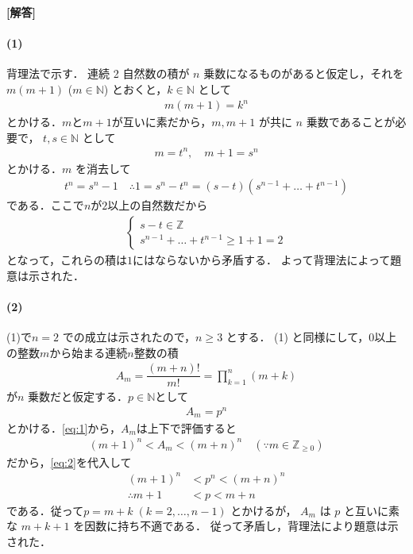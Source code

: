 \documentclass[../../main.tex]{subfiles}
\begin{document}
\begin{oframed}
  
\end{oframed}

{\bf [解答]}

\paragraph{(1)}

背理法で示す．
連続 2 自然数の積が $n$ 乗数になるものがあると仮定し，それを $m(m+1)$ ($m \in \mathbb{N}$) とおくと，$k \in \mathbb{N}$ として
\begin{align}
  m(m+1) = k^n
\end{align}
とかける．$m$と$m+1$が互いに素だから，$m, m+1$ が共に $n$ 乗数であることが必要で，
$t, s \in \mathbb{N}$ として
\begin{align}
  m = t^n, \quad m+1 = s^n
\end{align}
とかける．$m$ を消去して
\begin{align}
  t^n = s^n - 1 \quad \therefore 1 = s^n - t^n = (s-t)(s^{n-1} + \dots + t^{n-1})
\end{align}
である．ここで$n$が$2$以上の自然数だから
\begin{align}
  \begin{cases}
    s-t \in \mathbb{Z} \\
    s^{n-1} + \dots + t^{n-1} \ge 1+1 = 2
  \end{cases}
\end{align}
となって，これらの積は$1$にはならないから矛盾する．
よって背理法によって題意は示された．

\paragraph{(2)}

(1)で$n=2$ での成立は示されたので，$n \ge 3$ とする．
(1) と同様にして，$0$以上の整数$m$から始まる連続$n$整数の積
\begin{align}
  A_m = \dfrac{(m+n)!}{m!} = \prod_{k=1}^n (m+k) \label{eq:1}
\end{align}
が$n$ 乗数だと仮定する．$p\in\mathbb{N}$として
\begin{align}
  A_m = p^n \label{eq:2}
\end{align}
とかける．\cref{eq:1}から，$A_m$は上下で評価すると
\begin{align}
  (m+1)^n < A_m < (m+n)^n \quad  (\because m \in \mathbb{Z}_{\ge 0})
\end{align}
だから，\cref{eq:2}を代入して
\begin{align}
  (m+1)^n &< p^n < (m+n)^n \\
  \therefore
  m+1 &< p < m+n
\end{align}
である．従って$p = m+k \; (k=2, \dots, n-1)$ とかけるが，
$A_m$ は $p$ と互いに素な $m+k+1$ を因数に持ち不適である．
従って矛盾し，背理法により題意は示された．
\end{document}
